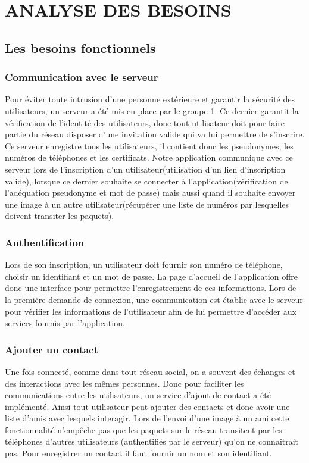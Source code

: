 \chapter{ ANALYSE DES BESOINS}

\section{Les besoins fonctionnels}

        \subsection{Communication avec le serveur}
        Pour éviter toute intrusion d'une personne extérieure et garantir la sécurité des utilisateurs, un serveur a été mis en place par le groupe 1. Ce dernier garantit la vérification de l'identité des utilisateurs, donc tout utilisateur doit pour faire partie du réseau disposer d'une invitation valide qui va lui permettre de s'inscrire.  Ce serveur enregistre tous les utilisateurs, il contient donc les pseudonymes, les numéros de téléphones et les certificats.
        Notre application communique avec ce serveur lors de l'inscription d'un utilisateur(utilisation d'un lien d'inscription valide), lorsque ce dernier souhaite se connecter à l'application(vérification de l'adéquation pseudonyme et mot de passe) mais aussi quand il souhaite envoyer une image à un autre utilisateur(récupérer une liste de numéros par lesquelles doivent transiter les paquets).
            
        
        \subsection{Authentification}
        Lors de son inscription, un utilisateur doit fournir son numéro de téléphone, choisir un identifiant et un mot de passe. La page d'accueil de l'application offre donc une interface pour permettre l'enregistrement de ces informations.
        Lors de la première demande de connexion, une communication est établie avec le serveur pour vérifier les informations de l'utilisateur afin de lui permettre d'accéder aux services fournis par l'application.
        
        \subsection{Ajouter un contact}
        Une fois connecté, comme dans tout réseau social, on a souvent des échanges et des interactions avec les mêmes personnes. Donc pour faciliter les communications entre les utilisateurs, un service d'ajout de contact a été implémenté. Ainsi tout utilisateur peut ajouter des contacts et donc avoir une liste d'amis avec lesquels interagir. Lors de l'envoi d'une image à un ami cette fonctionnalité n'empêche pas que les paquets sur le réseau transitent par les téléphones d'autres utilisateurs (authentifiés par le serveur) qu'on ne connaîtrait pas. Pour enregistrer un contact il faut fournir un nom et son identifiant.
        

